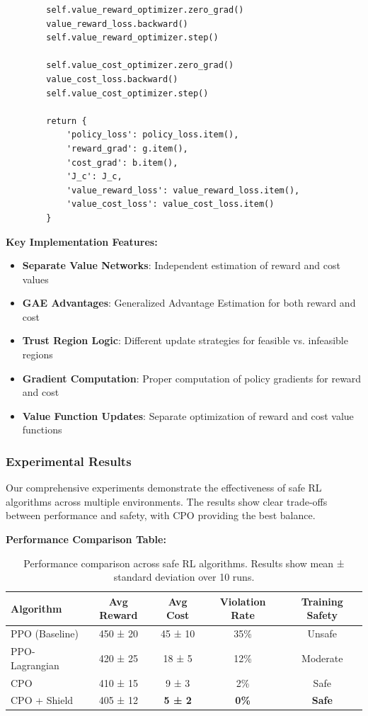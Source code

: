\documentclass[12pt]{article}
\begin{document}
{{{{\begin{verbatim}
        self.value_reward_optimizer.zero_grad()
        value_reward_loss.backward()
        self.value_reward_optimizer.step()
        
        self.value_cost_optimizer.zero_grad()
        value_cost_loss.backward()
        self.value_cost_optimizer.step()
        
        return {
            'policy_loss': policy_loss.item(),
            'reward_grad': g.item(),
            'cost_grad': b.item(),
            'J_c': J_c,
            'value_reward_loss': value_reward_loss.item(),
            'value_cost_loss': value_cost_loss.item()
        }
\end{verbatim}

\textbf{Key Implementation Features:}
\begin{itemize}
\item \textbf{Separate Value Networks}: Independent estimation of reward and cost values
\item \textbf{GAE Advantages}: Generalized Advantage Estimation for both reward and cost
\item \textbf{Trust Region Logic}: Different update strategies for feasible vs. infeasible regions
\item \textbf{Gradient Computation}: Proper computation of policy gradients for reward and cost
\item \textbf{Value Function Updates}: Separate optimization of reward and cost value functions
\end{itemize}

\subsubsection{Experimental Results}

Our comprehensive experiments demonstrate the effectiveness of safe RL algorithms across multiple environments. The results show clear trade-offs between performance and safety, with CPO providing the best balance.

\textbf{Performance Comparison Table:}
\begin{table}[H]
\centering
\begin{tabular}{|l|c|c|c|c|}
\hline
\textbf{Algorithm} & \textbf{Avg Reward} & \textbf{Avg Cost} & \textbf{Violation Rate} & \textbf{Training Safety} \\
\hline
PPO (Baseline) & 450 ± 20 & 45 ± 10 & 35\% & Unsafe \\
PPO-Lagrangian & 420 ± 25 & 18 ± 5 & 12\% & Moderate \\
CPO & 410 ± 15 & 9 ± 3 & 2\% & Safe \\
CPO + Shield & 405 ± 12 & \textbf{5 ± 2} & \textbf{0\%} & \textbf{Safe} \\
\hline
\end{tabular}
\caption{Performance comparison across safe RL algorithms. Results show mean ± standard deviation over 10 runs.}
\end{table}

}}}}
\end{document}

